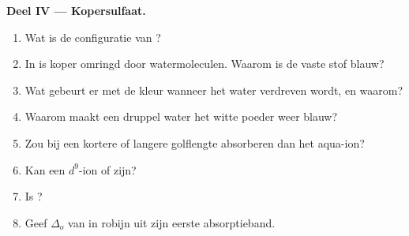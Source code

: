 \begin{problem}
\medskip
\noindent\textbf{Deel IV --- Kopersulfaat.}
\begin{enumerate}[resume]
  \item Wat is de configuratie van ?
  \item In  is koper omringd door watermoleculen. Waarom is de vaste stof blauw?
  \item Wat gebeurt er met de kleur wanneer het water verdreven wordt, en waarom?
  \item Waarom maakt een druppel water het witte poeder weer blauw?
  \item Zou  bij een kortere of langere golflengte absorberen dan het aqua-ion?
  \item Kan een $d^9$-ion  of  zijn?
  \item Is  ?
  \item Geef $\Delta_o$ van  in robijn uit zijn eerste absorptieband.
\end{enumerate}
\end{problem}

